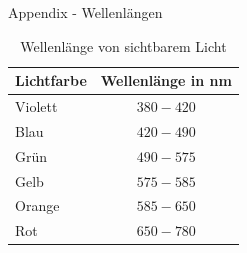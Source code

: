 \documentclass{beamer}
\begin{document}
\begin{frame}{Appendix - Wellenlängen}
    \begin{table}
        \centering %
        \begin{tabular}{l c}
            \toprule
            Lichtfarbe & Wellenlänge in nm \\
            \toprule
            Violett    & $380 - 420$       \\
            Blau       & $420 - 490$       \\
            Grün       & $490 - 575$       \\
            Gelb       & $575 - 585$       \\
            Orange     & $585 - 650$       \\
            Rot        & $650 - 780$       \\
            \bottomrule
        \end{tabular}
        \caption{Wellenlänge von sichtbarem Licht}
    \end{table}
\end{frame}

\end{document}
